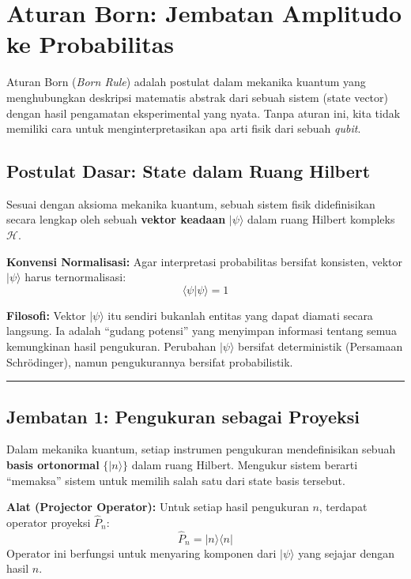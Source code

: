 \section{Aturan Born: Jembatan Amplitudo ke Probabilitas}\label{appendix-h}

Aturan Born (\emph{Born Rule}) adalah postulat dalam mekanika kuantum yang menghubungkan deskripsi matematis abstrak dari sebuah sistem (state vector) dengan hasil pengamatan eksperimental yang nyata. Tanpa aturan ini, kita tidak memiliki cara untuk menginterpretasikan apa arti fisik dari sebuah \emph{qubit}.

\hypertarget{postulat-dasar-state-dalam-ruang-hilbert}{%
\subsection{Postulat Dasar: State dalam Ruang Hilbert}\label{postulat-dasar-state-dalam-ruang-hilbert}}

Sesuai dengan aksioma mekanika kuantum, sebuah sistem fisik didefinisikan secara lengkap oleh sebuah \textbf{vektor keadaan} \(|\psi\rangle\) dalam ruang Hilbert kompleks \(\mathcal{H}\).

\textbf{Konvensi Normalisasi:} Agar interpretasi probabilitas bersifat konsisten, vektor \(|\psi\rangle\) harus ternormalisasi: \[ \langle \psi | \psi \rangle = 1 \]

\textbf{Filosofi:} Vektor \(|\psi\rangle\) itu sendiri bukanlah entitas yang dapat diamati secara langsung. Ia adalah ``gudang potensi'' yang menyimpan informasi tentang semua kemungkinan hasil pengukuran. Perubahan \(|\psi\rangle\) bersifat deterministik (Persamaan Schrödinger), namun pengukurannya bersifat probabilistik.

\begin{center}\rule{0.5\linewidth}{0.5pt}\end{center}

\hypertarget{jembatan-1-pengukuran-sebagai-proyeksi}{%
\subsection{Jembatan 1: Pengukuran sebagai Proyeksi}\label{jembatan-1-pengukuran-sebagai-proyeksi}}

Dalam mekanika kuantum, setiap instrumen pengukuran mendefinisikan sebuah \textbf{basis ortonormal} \(\{|n\rangle\}\) dalam ruang Hilbert. Mengukur sistem berarti ``memaksa'' sistem untuk memilih salah satu dari state basis tersebut.

\textbf{Alat (Projector Operator):} Untuk setiap hasil pengukuran \(n\), terdapat operator proyeksi \(\hat{P}_n\): \[ \hat{P}_n = |n\rangle\langle n | \] Operator ini berfungsi untuk menyaring komponen dari \(|\psi\rangle\) yang sejajar dengan hasil \(n\).

